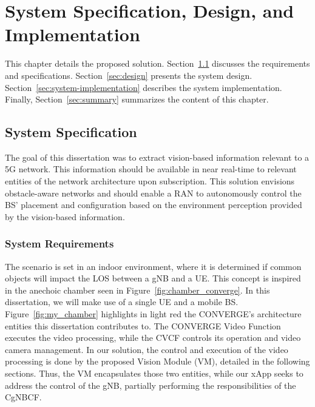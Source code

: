 \chapter{System Specification, Design, and Implementation}\label{ch:specs_design_implem}

This chapter details the proposed solution.
Section~\ref{sec:specs} discusses the requirements and specifications.
Section~\ref{sec:design} presents the system design.
Section~\ref{sec:system-implementation} describes the system implementation.
Finally, Section~\ref{sec:summary} summarizes the content of this chapter.

\section{System Specification}\label{sec:specs}
The goal of this dissertation was to extract vision-based information relevant to a 5G network.
This information should be available in near real-time to relevant entities of the network architecture upon subscription.
This solution envisions obstacle-aware networks and should enable a RAN to autonomously control the BS' placement and configuration based on the environment perception provided by the vision-based information.

\subsection{System Requirements}\label{subsec:system-requirements}

The scenario is set in an indoor environment, where it is determined if common objects will impact the LOS between a gNB and a UE\@.
This concept is inspired in the anechoic chamber seen in Figure~\ref{fig:chamber_converge}.
In this dissertation, we will make use of a single UE and a mobile BS\@.
Figure~\ref{fig:my_chamber} highlights in light red the CONVERGE's architecture entities this dissertation contributes to.
The CONVERGE Video Function executes the video processing, while the CVCF controls its operation and video camera management.
In our solution, the control and execution of the video processing is done by the proposed Vision Module (VM), detailed in the following sections.
Thus, the VM encapsulates those two entities, while our xApp seeks to address the control of the gNB, partially performing the responsibilities of the CgNBCF\@.

